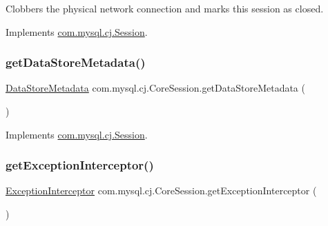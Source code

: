 Clobbers the physical network connection and marks this session as closed. 

Implements \mbox{\hyperlink{interfacecom_1_1mysql_1_1cj_1_1_session_a4394068e5b6e4534ae8d2d90ea4be2c6}{com.\+mysql.\+cj.\+Session}}.

\mbox{\label{classcom_1_1mysql_1_1cj_1_1_core_session_a470a60dea06a09fe2c519aa4ca88faf4}} 
\subsubsection{\texorpdfstring{get\+Data\+Store\+Metadata()}{getDataStoreMetadata()}}
{\footnotesize\ttfamily \mbox{\hyperlink{interfacecom_1_1mysql_1_1cj_1_1_data_store_metadata}{Data\+Store\+Metadata}} com.\+mysql.\+cj.\+Core\+Session.\+get\+Data\+Store\+Metadata (\begin{DoxyParamCaption}{ }\end{DoxyParamCaption})}



Implements \mbox{\hyperlink{interfacecom_1_1mysql_1_1cj_1_1_session_a863ee0712226bd70718bcc1f812c592d}{com.\+mysql.\+cj.\+Session}}.

\mbox{\label{classcom_1_1mysql_1_1cj_1_1_core_session_a8718a19455dcfc23e1f3e36d3278d7bd}} 
\subsubsection{\texorpdfstring{get\+Exception\+Interceptor()}{getExceptionInterceptor()}}
{\footnotesize\ttfamily \mbox{\hyperlink{interfacecom_1_1mysql_1_1cj_1_1exceptions_1_1_exception_interceptor}{Exception\+Interceptor}} com.\+mysql.\+cj.\+Core\+Session.\+get\+Exception\+Interceptor (\begin{DoxyParamCaption}{ }\end{DoxyParamCaption})}



